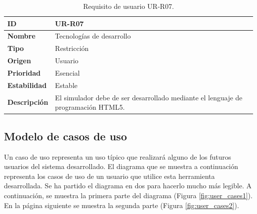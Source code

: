 \begin{center}
\begin{table}[htbp]
\centering
\caption{Requisito de usuario UR-R07.}
\begin{tabular}{@{}p{2.5cm} p{9cm}@{}} 
\toprule
\textbf{ID} 				& UR-R07 \\
\midrule
\textbf{Nombre} 			& Tecnologías de desarrollo \\
\midrule
\textbf{Tipo} 			& Restricción \\
\midrule
\textbf{Origen} 			& Usuario \\
\midrule
\textbf{Prioridad}		& Esencial \\
\midrule
\textbf{Estabilidad} 		& Estable \\
\midrule
\textbf{Descripción} 	& El simulador debe de ser desarrollado mediante el lenguaje de programación HTML5. \\
\bottomrule
\end{tabular}
\label{tab:urr07}
\end{table}
\end{center}

\subsection{Modelo de casos de uso}
\label{sec:user_cases}

Un caso de uso representa un uso típico que realizará alguno de los futuros usuarios del sistema desarrollado. El diagrama que se muestra a continuación representa los casos de uso de un usuario que utilice esta herramienta desarrollada. Se ha partido el diagrama en dos para hacerlo mucho más legible. A continuación, se muestra la primera parte del diagrama (Figura \ref{fig:user_cases1}). En la página siguiente se muestra la segunda parte (Figura \ref{fig:user_cases2}).

